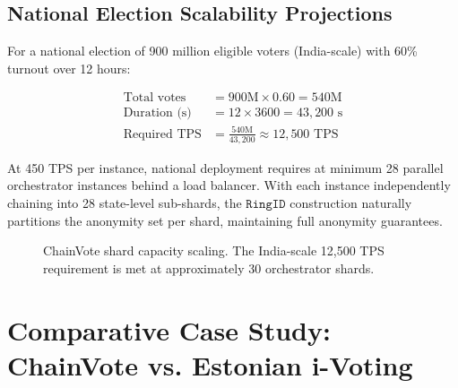 \documentclass[journal,10pt,twocolumn]{IEEEtran}
\begin{document}
\subsection{National Election Scalability Projections}

For a national election of 900 million eligible voters (India-scale) with 60\% turnout over 12 hours:

\begin{align}
    \text{Total votes} &= 900\text{M} \times 0.60 = 540\text{M} \\
    \text{Duration (s)} &= 12 \times 3600 = 43,\!200\text{ s} \\
    \text{Required TPS} &= \frac{540\text{M}}{43,\!200} \approx 12,\!500\text{ TPS}
\end{align}

At 450 TPS per instance, national deployment requires at minimum 28 parallel orchestrator instances behind a load balancer. With each instance independently chaining into 28 state-level sub-shards, the $\mathtt{RingID}$ construction naturally partitions the anonymity set per shard, maintaining full anonymity guarantees.

\begin{figure}[htbp]
\centering
{}
\caption{ChainVote shard capacity scaling. The India-scale 12,500 TPS requirement is met at approximately 30 orchestrator shards.}
\label{fig:national_scale}
\end{figure}

\section{Comparative Case Study: ChainVote vs. Estonian i-Voting}
\end{document}
